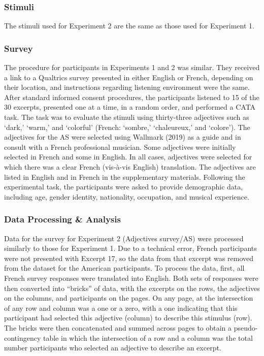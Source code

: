 \documentclass[
  english,
  man,floatsintext]{apa6}
\begin{document}
\hypertarget{stimuli-1}{%
\subsubsection{Stimuli}\label{stimuli-1}}

The stimuli used for Experiment 2 are the same as those used for Experiment 1.

\hypertarget{survey-1}{%
\subsubsection{Survey}\label{survey-1}}

The procedure for participants in Experiments 1 and 2 was similar. They received a link to a Qualtrics survey presented in either English or French, depending on their location, and instructions regarding listening environment were the same. After standard informed consent procedures, the participants listened to 15 of the 30 excerpts, presented one at a time, in a random order, and performed a CATA task. The task was to evaluate the stimuli using thirty-three adjectives such as `dark,' `warm,' and `colorful' (French: `sombre,' `chaleureux,' and `colore'). The adjectives for the AS were selected using Wallmark (2019) as a guide and in consult with a French professional musician. Some adjectives were initially selected in French and some in English. In all cases, adjectives were selected for which there was a clear French (vis-à-vis English) translation. The adjectives are listed in English and in French in the supplementary materials. Following the experimental task, the participants were asked to provide demographic data, including age, gender identity, nationality, occupation, and musical experience.

\hypertarget{data-processing-analysis}{%
\subsubsection{Data Processing \& Analysis}\label{data-processing-analysis}}

Data for the survey for Experiment 2 (Adjectives survey/AS) were processed similarly to those for Experiment 1. Due to a technical error, French participants were not presented with Excerpt 17, so the data from that excerpt was removed from the dataset for the American participants. To process the data, first, all French survey responses were translated into English. Both sets of responses were then converted into ``bricks'' of data, with the excerpts on the rows, the adjectives on the columns, and participants on the pages. On any page, at the intersection of any row and column was a one or a zero, with a one indicating that this participant had selected this adjective (column) to describe this stimulus (row). The bricks were then concatenated and summed across pages to obtain a pseudo-contingency table in which the intersection of a row and a column was the total number participants who selected an adjective to describe an excerpt.
\end{document}
